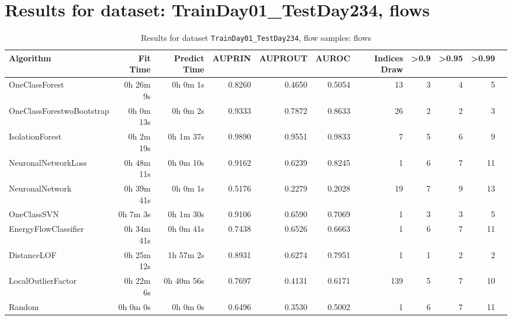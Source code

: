 \documentclass{article}
\begin{document}
\section*{Results for dataset: TrainDay01_TestDay234, flows}
\begin{table}[h!]
\centering
\caption{Results for dataset \texttt{TrainDay01_TestDay234}, flow samples: flows}
\label{tab:trainday01testday234_flows}
\begin{tabular}{lrrrrrrrrrr}
\toprule
Algorithm & Fit Time & Predict Time & AUPRIN & AUPROUT & AUROC & Indices Draw & >0.9 & >0.95 & >0.99 \\
\midrule
OneClassForest & 0h 26m 9s & 0h 0m 1s & 0.8260 & 0.4650 & 0.5054 & 13 & 3 & 4 & 5 \\
OneClassForestwoBootstrap & 0h 0m 13s & 0h 0m 2s & 0.9333 & 0.7872 & 0.8633 & 26 & 2 & 2 & 3 \\
IsolationForest & 0h 2m 19s & 0h 1m 37s & 0.9890 & 0.9551 & 0.9833 & 7 & 5 & 6 & 9 \\
NeuronalNetworkLoss & 0h 48m 11s & 0h 0m 10s & 0.9162 & 0.6239 & 0.8245 & 1 & 6 & 7 & 11 \\
NeuronalNetwork & 0h 39m 41s & 0h 0m 1s & 0.5176 & 0.2279 & 0.2028 & 19 & 7 & 9 & 13 \\
OneClassSVN & 0h 7m 3s & 0h 1m 30s & 0.9106 & 0.6590 & 0.7069 & 1 & 3 & 3 & 5 \\
EnergyFlowClassifier & 0h 34m 41s & 0h 0m 41s & 0.7438 & 0.6526 & 0.6663 & 1 & 6 & 7 & 11 \\
DistanceLOF & 0h 25m 12s & 1h 57m 2s & 0.8931 & 0.6274 & 0.7951 & 1 & 1 & 2 & 2 \\
LocalOutlierFactor & 0h 22m 6s & 0h 40m 56s & 0.7697 & 0.4131 & 0.6171 & 139 & 5 & 7 & 10 \\
Random & 0h 0m 0s & 0h 0m 0s & 0.6496 & 0.3530 & 0.5002 & 1 & 6 & 7 & 11 \\
\bottomrule
\end{tabular}
\end{table}
\end{document}
